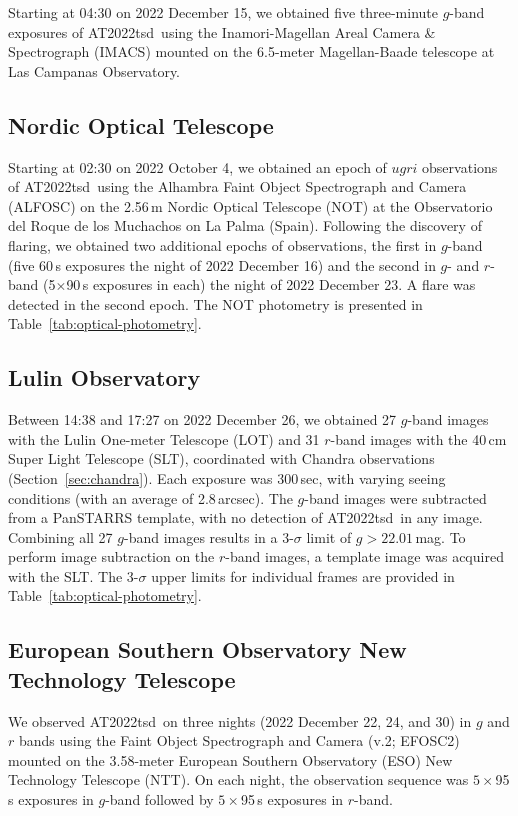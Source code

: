 \documentclass{nature_plusfigure}
\newcommand{\at}{AT2022tsd}
\begin{document}
\begin{methods}
Starting at 04:30 on 2022 December 15, we obtained five three-minute $g$-band exposures of \at\ using the Inamori-Magellan Areal Camera \& Spectrograph (IMACS\cite{Dressler2011}) mounted on the 6.5-meter Magellan-Baade telescope at Las Campanas Observatory.

\subsection{Nordic Optical Telescope}
\label{sec:not}

Starting at 02:30 on 2022 October 4, we obtained an epoch of $ugri$ observations of \at\ using the Alhambra Faint Object Spectrograph and Camera (ALFOSC) on the 2.56\,m Nordic Optical Telescope (NOT) at the Observatorio del Roque de los Muchachos on La Palma (Spain). Following the discovery of flaring, we obtained two additional epochs of observations, the first in $g$-band (five 60\,s exposures the night of 2022 December 16) and the second in $g$- and $r$-band (5$\times$90\,s exposures in each) the night of 2022 December 23. A flare was detected in the second epoch.
The NOT photometry is presented in Table~\ref{tab:optical-photometry}.

\subsection{Lulin Observatory}
\label{sec:lulin}

Between 14:38 and 17:27 on 2022 December 26, we obtained 
27 $g$-band images with the Lulin One-meter Telescope (LOT) and 31 $r$-band images with the 40\,cm Super Light Telescope (SLT), coordinated with Chandra observations (Section~\ref{sec:chandra}). Each exposure was 300\,sec, with varying seeing conditions (with an average of 2.8\,arcsec). The $g$-band images were subtracted from a PanSTARRS template, with no detection of \at\ in any image.
Combining all 27 $g$-band images results in a 3-$\sigma$ limit of $g>22.01$\,mag.
To perform image subtraction on the $r$-band images, a template image was acquired with the SLT.
The 3-$\sigma$ upper limits for individual frames are provided in Table~\ref{tab:optical-photometry}.

\subsection{European Southern Observatory New Technology Telescope}
\label{sec:ntt}

We observed \at\ on three nights (2022 December 22, 24, and 30) in $g$ and $r$ bands using the Faint Object Spectrograph and Camera (v.2; EFOSC2\cite{Buzzoni1984}) mounted on the 3.58-meter European Southern Observatory (ESO) New Technology Telescope (NTT). On each night, the observation sequence was $5\times$95\,s exposures in $g$-band followed by $5\times$95\,s exposures in $r$-band.


\end{methods}
\end{document}
